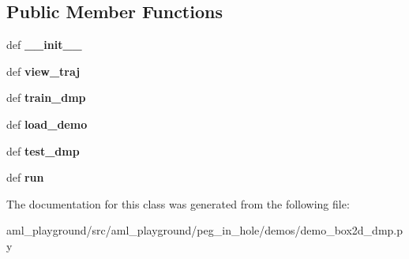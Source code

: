 \subsection*{Public Member Functions}
\begin{DoxyCompactItemize}
\item 
\hypertarget{classdemo__box2d__dmp_1_1_box2d_d_m_p_aa7f23b5427e33b0bd08a0d52186fd0b2}{def {\bfseries \-\_\-\-\_\-init\-\_\-\-\_\-}}\label{classdemo__box2d__dmp_1_1_box2d_d_m_p_aa7f23b5427e33b0bd08a0d52186fd0b2}

\item 
\hypertarget{classdemo__box2d__dmp_1_1_box2d_d_m_p_acc2952a420dc11cc57a31c06164c88c3}{def {\bfseries view\-\_\-traj}}\label{classdemo__box2d__dmp_1_1_box2d_d_m_p_acc2952a420dc11cc57a31c06164c88c3}

\item 
\hypertarget{classdemo__box2d__dmp_1_1_box2d_d_m_p_a56f7876d097ac60dd5146d668d742914}{def {\bfseries train\-\_\-dmp}}\label{classdemo__box2d__dmp_1_1_box2d_d_m_p_a56f7876d097ac60dd5146d668d742914}

\item 
\hypertarget{classdemo__box2d__dmp_1_1_box2d_d_m_p_a88d238e0864d5646e3c26e13ce9543bd}{def {\bfseries load\-\_\-demo}}\label{classdemo__box2d__dmp_1_1_box2d_d_m_p_a88d238e0864d5646e3c26e13ce9543bd}

\item 
\hypertarget{classdemo__box2d__dmp_1_1_box2d_d_m_p_aefcded469374ea20dc10673ec941e44a}{def {\bfseries test\-\_\-dmp}}\label{classdemo__box2d__dmp_1_1_box2d_d_m_p_aefcded469374ea20dc10673ec941e44a}

\item 
\hypertarget{classdemo__box2d__dmp_1_1_box2d_d_m_p_a76816bc92ffd1a074191def3d9fbc601}{def {\bfseries run}}\label{classdemo__box2d__dmp_1_1_box2d_d_m_p_a76816bc92ffd1a074191def3d9fbc601}

\end{DoxyCompactItemize}


The documentation for this class was generated from the following file\-:\begin{DoxyCompactItemize}
\item 
aml\-\_\-playground/src/aml\-\_\-playground/peg\-\_\-in\-\_\-hole/demos/demo\-\_\-box2d\-\_\-dmp.\-py\end{DoxyCompactItemize}
